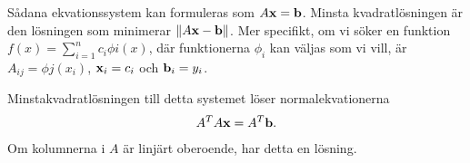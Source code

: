 Sådana ekvationssystem kan formuleras som $A\vb{x} = \vb{b}$. Minsta kvadratlösningen är den lösningen som minimerar $\norm{A\vb{x} - \vb{b}}$. Mer specifikt, om vi söker en funktion $f(x) = \sum\limits_{i = 1}^{n}c_{i}\phi{i}(x)$, där funktionerna $\phi_{i}$ kan väljas som vi vill, är $A_{ij} = \phi{j}(x_{i})$, $\vb{x}_{i} = c_{i}$ och $\vb{b}_{i} = y_{i}$.

Minstakvadratlösningen till detta systemet löser normalekvationerna
\begin{align*}
	A^{T}A\vb{x} = A^{T}\vb{b}.
\end{align*}
Om kolumnerna i $A$ är linjärt oberoende, har detta en lösning.